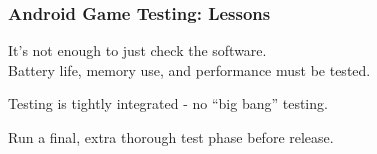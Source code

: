 \begin{frame}
\frametitle{Android Game Testing: Lessons}
\begin{changemargin}{1cm}

It's not enough to just check the software.\\
	\quad Battery life, memory use, and performance must be tested.

Testing is tightly integrated - no ``big bang'' testing.

Run a final, extra thorough test phase before release.

\end{changemargin}
\end{frame}



